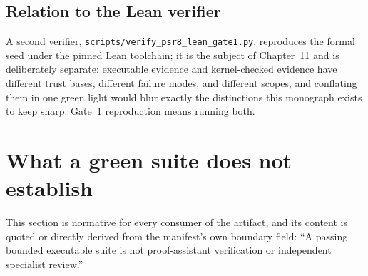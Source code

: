 \subsection{Relation to the Lean verifier}

A second verifier, \texttt{scripts/verify\_psr8\_lean\_gate1.py},
reproduces the formal seed under the pinned Lean toolchain; it is the
subject of Chapter~11 and is deliberately separate: executable evidence
and kernel-checked evidence have different trust bases, different failure
modes, and different scopes, and conflating them in one green light would
blur exactly the distinctions this monograph exists to keep sharp. Gate~1
reproduction means running both.

\section{What a green suite does not establish}\label{ch10:sec:negative}

This section is normative for every consumer of the artifact, and its
content is quoted or directly derived from the manifest's own boundary
field: ``A passing bounded executable suite is not proof-assistant
verification or independent specialist review.''

